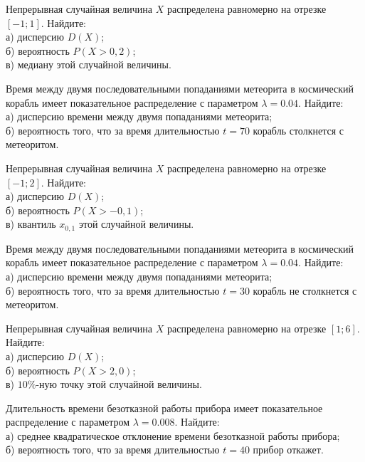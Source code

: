 \vfill

\newpage\setcounter{zad}{0}

\z Непрерывная случайная величина $X$ распределена равномерно на отрезке $[-1; 1]$. Найдите: \\ \quad а) дисперсию $D(X)$; \\ \quad б) вероятность $P(X>0{,}2)$; \\ \quad в) медиану этой случайной величины.


\vfill

\z Время между двумя последовательными попаданиями метеорита в космический корабль имеет показательное распределение с параметром $\lambda = 0.04$. Найдите: \\ \quad а) дисперсию времени между двумя попаданиями метеорита; \\ \quad б) вероятность того, что за время длительностью $t = 70$ корабль  столкнется с метеоритом.
 

\vfill

\newpage\setcounter{zad}{0}

\z Непрерывная случайная величина $X$ распределена равномерно на отрезке $[-1; 2]$. Найдите: \\ \quad а) дисперсию $D(X)$; \\ \quad б) вероятность $P(X>-0{,}1)$; \\ \quad в) квантиль $x_{0{,}1}$ этой случайной величины.


\vfill

\z Время между двумя последовательными попаданиями метеорита в космический корабль имеет показательное распределение с параметром $\lambda = 0.04$. Найдите: \\ \quad а) дисперсию времени между двумя попаданиями метеорита; \\ \quad б) вероятность того, что за время длительностью $t = 30$ корабль не столкнется с метеоритом.
 

\vfill

\newpage\setcounter{zad}{0}

\z Непрерывная случайная величина $X$ распределена равномерно на отрезке $[1; 6]$. Найдите: \\ \quad а) дисперсию $D(X)$; \\ \quad б) вероятность $P(X>2{,}0)$; \\ \quad в) $10\%$-ную точку этой случайной величины.


\vfill

\z Длительность времени безотказной работы прибора имеет показательное распределение с параметром $\lambda = 0.008$. Найдите: \\ \quad а) среднее квадратическое отклонение времени безотказной работы прибора; \\ \quad б) вероятность того, что за время длительностью $t = 40$ прибор  откажет.
 

